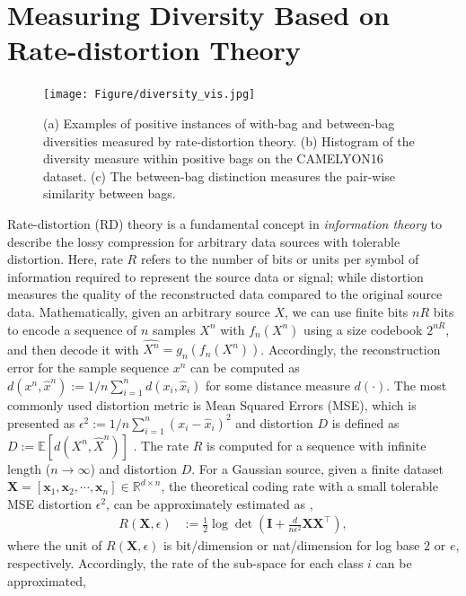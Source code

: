 \section{Measuring Diversity Based on Rate-distortion Theory}
\begin{figure}[!ht]
    \centering
    \texttt{[image: Figure/diversity\_vis.jpg]}
    \caption{(a) Examples of positive instances of with-bag and between-bag diversities measured by rate-distortion theory. (b) Histogram of the diversity measure within positive bags on the CAMELYON16 dataset. (c) The between-bag distinction measures the pair-wise similarity between bags.}  %
    \label{fig:1}
\end{figure}
 Rate-distortion (RD) theory is a fundamental concept in \textit{information theory} to describe the lossy compression for arbitrary data sources with tolerable distortion. Here, rate $R$ refers to the number of bits or units per symbol of information required to represent the source data or signal; while distortion measures the quality of the reconstructed data compared to the original source data. 
 Mathematically, given an arbitrary source $X$, we can use finite bits $nR$ bits to encode a sequence of $n$ samples $X^n$ with $f_n(X^n)$ using a size codebook $2^{nR}$, and then decode it with
$\hat{X^n}=g_n(f_n(X^n))$. Accordingly, the reconstruction error for the sample sequence $x^n$ can be computed as $d(x^n,\hat{x}^n) := 1/n \sum_{i=1}^n d(x_i,\hat{x}_i)$ for some distance measure $d(\cdot)$. The most commonly used distortion metric is Mean Squared Errors (MSE), which is presented as $\epsilon^2:=1/n \sum_{i=1}^n (x_i-\hat{x}_i)^2$ and distortion $D$ is defined as $D:=\mathbb{E}[d(X^n, \hat{X}^n)]$ \cite{cover1999elements}. The rate $R$ is computed for a sequence with infinite length ($n \rightarrow \infty$) and distortion $D$. For a Gaussian source, given a finite dataset $\boldsymbol{X}=[\boldsymbol{x}_1,\boldsymbol{x}_2,\cdots,\boldsymbol{x}_n]\in \mathbb{R}^{d\times n}$, the theoretical coding rate with a small tolerable MSE distortion $\epsilon^2$, can be approximately estimated
as \cite{ma2007segmentation}, 
\begin{align}\label{eq:r0}
    R(\boldsymbol{X}, \epsilon) &:= \frac{1}{2} \log \operatorname{det}\left(\boldsymbol{I}+\frac{d}{n \epsilon^2} \boldsymbol{X} \boldsymbol{X}^{\top}\right),
\end{align}
where the unit of $ R(\boldsymbol{X}, \epsilon)$ is bit/dimension or nat/dimension for log base $2$ or $e$, respectively. Accordingly, the rate of the sub-space for each class $i$ can be approximated,

